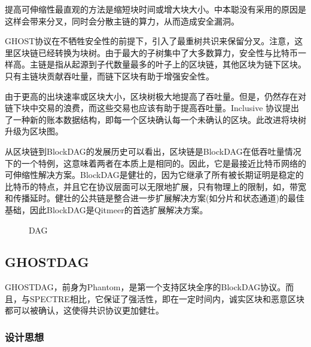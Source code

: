 \documentclass[a4paper,11pt]{article}
\begin{document}
提高可伸缩性最直观的方法是缩短块时间或增大块大小。中本聪没有采用的原因是这样会带来分叉，同时会分散主链的算力，从而造成安全漏洞。


GHOST协议在不牺牲安全性的前提下，引入了最重树共识来保留分叉。注意，这里区块链已经转换为块树。由于最大的子树集中了大多数算力，安全性与比特币一样高。主链是指从起源到子代数量最多的叶子上的区块链，其他区块为链下区块。只有主链块贡献吞吐量，而链下区块有助于增强安全性。

由于更高的出块速率或区块大小，区块树极大地提高了吞吐量。但是，仍然存在对链下块中交易的浪费，而这些交易也应该有助于提高吞吐量。Inclusive\cite{Inclusive} 协议提出了一种新的账本数据结构，即每一个区块确认每一个未确认的区块。此改进将块树升级为区块图。

从区块链到BlockDAG的发展历史可以看出，区块链是BlockDAG在低吞吐量情况下的一个特例，这意味着两者在本质上是相同的。因此，它是最接近比特币网络的可伸缩性解决方案。BlockDAG是健壮的，因为它继承了所有被长期证明是稳定的比特币的特点，并且它在协议层面可以无限地扩展，只有物理上的限制，如，带宽和传播延时。健壮的公共链是整合进一步扩展解决方案(如分片和状态通道)的最佳基础，因此BlockDAG是Qitmeer的首选扩展解决方案。


\begin{figure}[hbt]
	\centerline{%
	}
\caption{DAG}
\end{figure}

\subsection{GHOSTDAG}

GHOSTDAG，前身为Phantom，是第一个支持区块全序的BlockDAG协议。而且，与SPECTRE相比，它保证了强活性，即在一定时间内，诚实区块和恶意区块都可以被确认，这使得共识协议更加健壮。

\subsubsection{设计思想}
\end{document}
